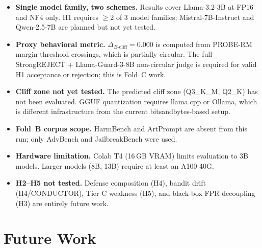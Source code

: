 \documentclass[11pt,a4paper]{article}
\newcommand{\bcliff}{\Delta_{B\text{-cliff}}}
\begin{document}
\begin{itemize}[leftmargin=1.5em, itemsep=3pt]
  \item \textbf{Single model family, two schemes.}
        Results cover Llama-3.2-3B at FP16 and NF4 only.
        H1 requires $\ge 2$ of 3 model families; Mistral-7B-Instruct and
        Qwen-2.5-7B are planned but not yet tested.
  \item \textbf{Proxy behavioral metric.}
        $\bcliff = 0.000$ is computed from PROBE-RM margin threshold crossings,
        which is partially circular.
        The full StrongREJECT \citep{souly2024strongreject} +
        Llama-Guard-3-8B \citep{inan2023llama_guard} non-circular judge is
        required for valid H1 acceptance or rejection; this is Fold~C work.
  \item \textbf{Cliff zone not yet tested.}
        The predicted cliff zone (Q3\_K\_M, Q2\_K) has not been evaluated.
        GGUF quantization requires llama.cpp or Ollama, which is different
        infrastructure from the current bitsandbytes-based setup.
  \item \textbf{Fold~B corpus scope.}
        HarmBench \citep{mazeika2024harmbench} and ArtPrompt are absent from
        this run; only AdvBench and JailbreakBench were used.
  \item \textbf{Hardware limitation.}
        Colab T4 (16\,GB VRAM) limits evaluation to 3B models.
        Larger models (8B, 13B) require at least an A100-40G.
  \item \textbf{H2--H5 not tested.}
        Defense composition (H4), bandit drift (H4/CONDUCTOR), Tier-C weakness
        (H5), and black-box FPR decoupling (H3) are entirely future work.
\end{itemize}

\section{Future Work}
\label{sec:future}
\end{document}
